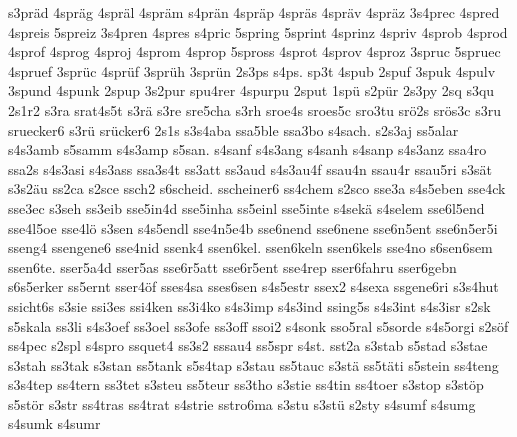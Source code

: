 {    s3präd
    4spräg
    4spräl
    4spräm
    s4prän
    4spräp
    4spräs
    4spräv
    4spräz
    3s4prec
    4spred
    4spreis
    5spreiz
    3s4pren
    4spres
    s4pric
    5spring
    5sprint
    4sprinz
    4spriv
    4sprob
    4sprod
    4sprof
    4sprog
    4sproj
    4sprom
    4sprop
    5spross
    4sprot
    4sprov
    4sproz
    3spruc
    5spruec
    4spruef
    3sprüc
    4sprüf
    3sprüh
    3sprün
    2s3ps
    s4ps.
    sp3t
    4spub
    2spuf
    3spuk
    4spulv
    3spund
    4spunk
    2spup
    3s2pur
    spu4rer
    4spurpu
    2sput
    1spü
    s2pür
    2s3py
    2sq
    s3qu
    2s1r2
    s3ra
    srat4s5t
    s3rä
    s3re
    sre5cha
    s3rh
    sroe4s
    sroes5c
    sro3tu
    srö2s
    srös3c
    s3ru
    sruecker6
    s3rü
    srücker6
    2s1s
    s3s4aba
    ssa5ble
    ssa3bo
    s4sach.
    s2s3aj
    ss5alar
    s4s3amb
    s5samm
    s4s3amp
    s5san.
    s4sanf
    s4s3ang
    s4sanh
    s4sanp
    s4s3anz
    ssa4ro
    ssa2s
    s4s3asi
    s4s3ass
    ssa3s4t
    ss3att
    ss3aud
    s4s3au4f
    ssau4n
    ssau4r
    ssau5ri
    s3sät
    s3s2äu
    ss2ca
    s2sce
    ssch2
    s6scheid.
    sscheiner6
    ss4chem
    s2sco
    sse3a
    s4s5eben
    sse4ck
    sse3ec
    s3seh
    ss3eib
    sse5in4d
    sse5inha
    ss5einl
    sse5inte
    s4sekä
    s4selem
    sse6l5end
    sse4l5oe
    sse4lö
    s3sen
    s4s5endl
    sse4n5e4b
    sse6nend
    sse6nene
    sse6n5ent
    sse6n5er5i
    sseng4
    ssengene6
    sse4nid
    ssenk4
    ssen6kel.
    ssen6keln
    ssen6kels
    sse4no
    s6sen6sem
    ssen6te.
    sser5a4d
    sser5as
    sse6r5att
    sse6r5ent
    sse4rep
    sser6fahru
    sser6gebn
    s6s5erker
    ss5ernt
    sser4öf
    sses4sa
    sses6sen
    s4s5estr
    ssex2
    s4sexa
    ssgene6ri
    s3s4hut
    ssicht6s
    s3sie
    ssi3es
    ssi4ken
    ss3i4ko
    s4s3imp
    s4s3ind
    ssing5s
    s4s3int
    s4s3isr
    s2sk
    s5skala
    ss3li
    s4s3oef
    ss3oel
    ss3ofe
    ss3off
    ssoi2
    s4sonk
    sso5ral
    s5sorde
    s4s5orgi
    s2söf
    ss4pec
    s2spl
    s4spro
    ssquet4
    ss3s2
    sssau4
    ss5spr
    s4st.
    sst2a
    s3stab
    s5stad
    s3stae
    s3stah
    ss3tak
    s3stan
    ss5tank
    s5s4tap
    s3stau
    ss5tauc
    s3stä
    ss5täti
    s5stein
    ss4teng
    s3s4tep
    ss4tern
    ss3tet
    s3steu
    ss5teur
    ss3tho
    s3stie
    ss4tin
    ss4toer
    s3stop
    s3stöp
    s5stör
    s3str
    ss4tras
    ss4trat
    s4strie
    sstro6ma
    s3stu
    s3stü
    s2sty
    s4sumf
    s4sumg
    s4sumk
    s4sumr
}
